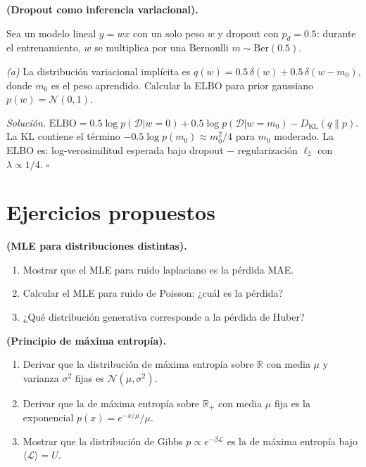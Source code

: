 \begin{ejercicio}
\label{ej:dropout_variacional}
\textbf{(Dropout como inferencia variacional).}

Sea un modelo lineal $y = w x$ con un solo peso $w$ y dropout con
$p_d = 0.5$: durante el entrenamiento, $w$ se multiplica por una
Bernoulli $m \sim \text{Ber}(0.5)$.

\medskip\noindent\textit{(a)} La distribución variacional implícita es
$q(w) = 0.5\,\delta(w) + 0.5\,\delta(w-m_0)$, donde $m_0$ es el peso
aprendido. Calcular la ELBO para prior gaussiano $p(w) = \mathcal{N}(0,1)$.

\medskip\noindent\textit{Solución.}
$\text{ELBO} = 0.5\log p(\mathcal{D}|w=0) + 0.5\log p(\mathcal{D}|w=m_0)
- D_{\text{KL}}(q\|p)$.
La KL contiene el término $-0.5\log p(m_0) \approx m_0^2/4$ para $m_0$
moderado. La ELBO es: log-verosimilitud esperada bajo dropout $-$
regularización $\ell_2$ con $\lambda \propto 1/4$. $\square$
\end{ejercicio}

\section*{Ejercicios propuestos}

\begin{ejercicio}
\textbf{(MLE para distribuciones distintas).}
\begin{enumerate}[label=(\alph*)]
  \item Mostrar que el MLE para ruido laplaciano es la pérdida MAE.
  \item Calcular el MLE para ruido de Poisson: ¿cuál es la pérdida?
  \item ¿Qué distribución generativa corresponde a la pérdida de Huber?
\end{enumerate}
\end{ejercicio}

\begin{ejercicio}
\textbf{(Principio de máxima entropía).}
\begin{enumerate}[label=(\alph*)]
  \item Derivar que la distribución de máxima entropía sobre $\mathbb{R}$
        con media $\mu$ y varianza $\sigma^2$ fijas es
        $\mathcal{N}(\mu,\sigma^2)$.
  \item Derivar que la de máxima entropía sobre $\mathbb{R}_+$ con media
        $\mu$ fija es la exponencial $p(x) = e^{-x/\mu}/\mu$.
  \item Mostrar que la distribución de Gibbs
        $p \propto e^{-\beta\mathcal{L}}$ es la de máxima entropía bajo
        $\langle\mathcal{L}\rangle = U$.
\end{enumerate}
\end{ejercicio}

